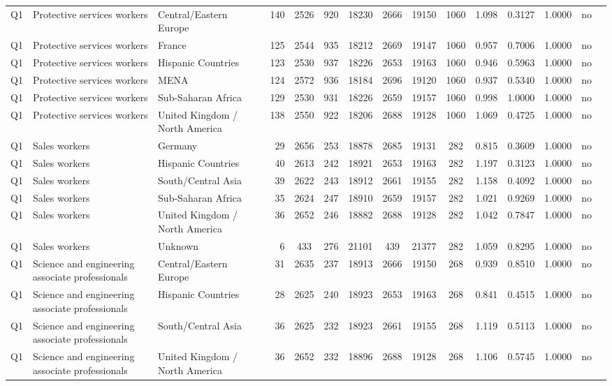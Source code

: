 \begin{longtable}{lllrcccccccccll}
Q1 & Protective services workers & Central/Eastern Europe & 140 & 2526 & 920 & 18230 & 2666 & 19150 & 1060 & 1.098 & 0.3127 & 1.0000 & no \\
Q1 & Protective services workers & France & 125 & 2544 & 935 & 18212 & 2669 & 19147 & 1060 & 0.957 & 0.7006 & 1.0000 & no \\
Q1 & Protective services workers & Hispanic Countries & 123 & 2530 & 937 & 18226 & 2653 & 19163 & 1060 & 0.946 & 0.5963 & 1.0000 & no \\
Q1 & Protective services workers & MENA & 124 & 2572 & 936 & 18184 & 2696 & 19120 & 1060 & 0.937 & 0.5340 & 1.0000 & no \\
Q1 & Protective services workers & Sub-Saharan Africa & 129 & 2530 & 931 & 18226 & 2659 & 19157 & 1060 & 0.998 & 1.0000 & 1.0000 & no \\
Q1 & Protective services workers & United Kingdom / North America & 138 & 2550 & 922 & 18206 & 2688 & 19128 & 1060 & 1.069 & 0.4725 & 1.0000 & no \\
Q1 & Sales workers & Germany & 29 & 2656 & 253 & 18878 & 2685 & 19131 & 282 & 0.815 & 0.3609 & 1.0000 & no \\
Q1 & Sales workers & Hispanic Countries & 40 & 2613 & 242 & 18921 & 2653 & 19163 & 282 & 1.197 & 0.3123 & 1.0000 & no \\
Q1 & Sales workers & South/Central Asia & 39 & 2622 & 243 & 18912 & 2661 & 19155 & 282 & 1.158 & 0.4092 & 1.0000 & no \\
Q1 & Sales workers & Sub-Saharan Africa & 35 & 2624 & 247 & 18910 & 2659 & 19157 & 282 & 1.021 & 0.9269 & 1.0000 & no \\
Q1 & Sales workers & United Kingdom / North America & 36 & 2652 & 246 & 18882 & 2688 & 19128 & 282 & 1.042 & 0.7847 & 1.0000 & no \\
Q1 & Sales workers & Unknown & 6 & 433 & 276 & 21101 & 439 & 21377 & 282 & 1.059 & 0.8295 & 1.0000 & no \\
Q1 & Science and engineering associate professionals & Central/Eastern Europe & 31 & 2635 & 237 & 18913 & 2666 & 19150 & 268 & 0.939 & 0.8510 & 1.0000 & no \\
Q1 & Science and engineering associate professionals & Hispanic Countries & 28 & 2625 & 240 & 18923 & 2653 & 19163 & 268 & 0.841 & 0.4515 & 1.0000 & no \\
Q1 & Science and engineering associate professionals & South/Central Asia & 36 & 2625 & 232 & 18923 & 2661 & 19155 & 268 & 1.119 & 0.5113 & 1.0000 & no \\
Q1 & Science and engineering associate professionals & United Kingdom / North America & 36 & 2652 & 232 & 18896 & 2688 & 19128 & 268 & 1.106 & 0.5745 & 1.0000 & no \\

\end{longtable}
